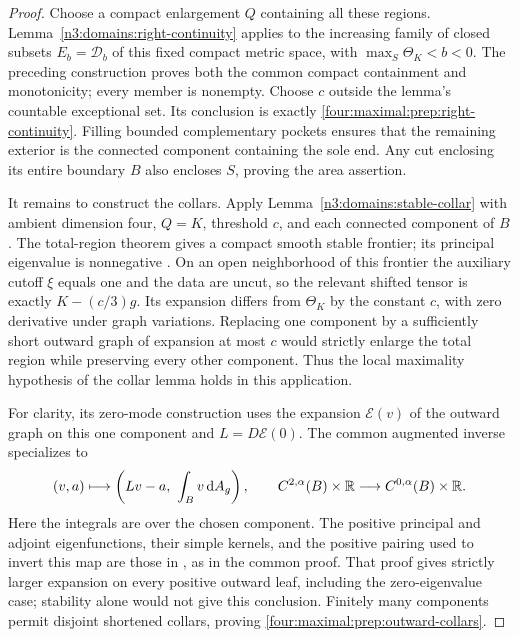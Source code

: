 \begin{proof}
Choose a compact enlargement \(Q\) containing all these regions.
Lemma~\ref{n3:domains:right-continuity} applies to the increasing family
of closed subsets \(E_b=\mathcal D_b\) of this fixed compact metric
space, with \(\max_S\Theta_K<b<0\).  The preceding construction proves
both the common compact containment and monotonicity; every member is
nonempty.  Choose \(c\) outside the lemma's countable exceptional set.
Its conclusion is exactly \eqref{four:maximal:prep:right-continuity}.
Filling bounded complementary
pockets ensures that the remaining exterior is the connected
component containing the sole end.  Any cut enclosing its entire
boundary \(B\) also encloses \(S\), proving the area assertion.

It remains to construct the collars.  Apply
Lemma~\ref{n3:domains:stable-collar} with ambient dimension four,
\(Q=K\), threshold \(c\), and each connected component of \(B\).
The total-region theorem gives a compact smooth stable frontier;
its principal eigenvalue is nonnegative
\cite[Proposition~5.1]{AnderssonMarsSimon2008}.  On an open neighborhood
of this frontier the auxiliary cutoff \(\xi\) equals one and the data
are uncut, so the relevant shifted tensor is exactly \(K-(c/3)g\).
Its expansion differs from \(\Theta_K\) by the constant \(c\), with
zero derivative under graph variations.  Replacing one component by
a sufficiently short outward graph of expansion at most \(c\)
would strictly enlarge the total region while preserving every other
component.  Thus the local maximality hypothesis of the collar lemma
holds in this application.

For clarity, its zero-mode construction uses the expansion
\(\mathcal E(v)\) of the outward graph on this one component and
\(L=D\mathcal E(0)\).  The common augmented inverse specializes to
\begin{equation}
 (v,a)\longmapsto\left(Lv-a,\ \int_Bv\,\mathrm d A_g\right),
 \qquad C^{2,\alpha}(B)\times\mathbb R
             \longrightarrow C^{0,\alpha}(B)\times\mathbb R.
\label{four:maximal:prep:augmented-inverse}
\end{equation}
Here the integrals are over the chosen component.  The positive
principal and adjoint eigenfunctions, their simple kernels, and the
positive pairing used to invert this map are those in
\cite[Section~4, Lemma~4.1]{AnderssonMarsSimon2008}, as in the common
proof.  That proof gives strictly larger expansion on every positive
outward leaf, including the zero-eigenvalue case; stability alone
would not give this conclusion.  Finitely many components permit
disjoint shortened collars, proving
\eqref{four:maximal:prep:outward-collars}.
\end{proof}

